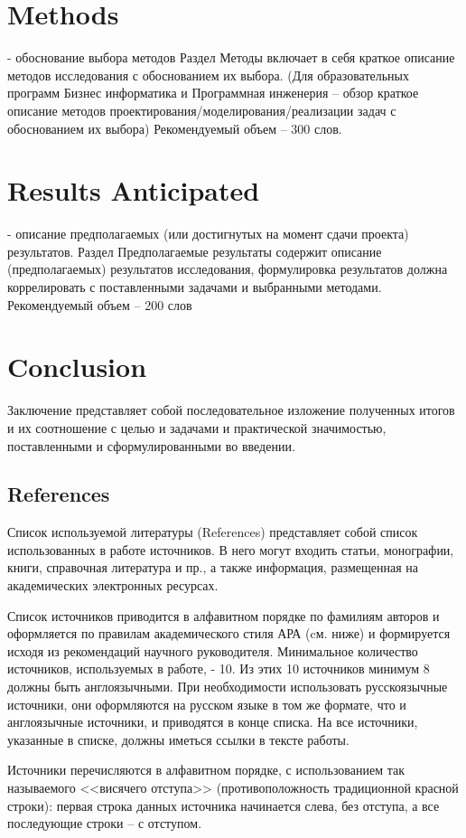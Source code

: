 \documentclass[PI]{ProjectProposal}
\begin{document}
\chapter*{Methods}
- обоснование выбора методов
Раздел Методы включает в себя краткое описание методов исследования с обоснованием их выбора. (Для образовательных программ Бизнес информатика и Программная инженерия – обзор краткое описание методов проектирования/моделирования/реализации задач с обоснованием их выбора) Рекомендуемый объем – 300 слов.


\chapter*{Results Anticipated}
- описание предполагаемых (или достигнутых на момент сдачи проекта) результатов.
Раздел Предполагаемые результаты содержит описание (предполагаемых) результатов исследования, формулировка результатов должна коррелировать с поставленными задачами и выбранными методами. Рекомендуемый объем – 200 слов

\chapter*{Conclusion}
Заключение представляет собой последовательное изложение полученных итогов и их соотношение с целью и задачами и практической значимостью, поставленными и сформулированными во введении.

\section{References}
Список используемой литературы (References) представляет собой список использованных в работе источников. В него могут входить статьи, монографии, книги, справочная литература и пр., а также информация, размещенная на академических электронных ресурсах.


Список источников приводится в алфавитном порядке по фамилиям авторов и оформляется по правилам академического стиля АРА (cм. ниже) и формируется исходя из рекомендаций научного руководителя. Минимальное количество источников, используемых в работе, - 10. Из этих 10 источников минимум 8 должны быть англоязычными. При необходимости использовать русскоязычные источники, они оформляются на русском языке в том же формате, что и англоязычные источники, и приводятся в конце списка. На все источники, указанные в списке, должны иметься ссылки в тексте работы.

Источники перечисляются в алфавитном порядке, с использованием так называемого <<висячего отступа>> (противоположность традиционной красной строки): первая строка данных источника начинается слева, без отступа, а все последующие строки – с отступом.
\end{document}
